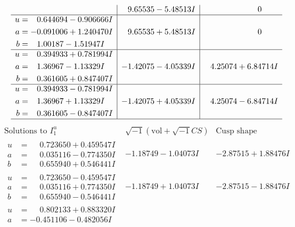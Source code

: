 \documentclass[1p]{elsarticle_modified}
\theoremstyle{definition}
\newcommand{\I}{\sqrt{-1}}
\begin{document}
$$\begin{array}{c|c|c}
 & \phantom{-}9.65535 - 5.48513 I & \phantom{-0.000000 } 0 \\ \hline\begin{aligned}
u &= \phantom{-}0.644694 - 0.906666 I \\
a &= -0.091006 + 1.240470 I \\
b &= \phantom{-}1.00187 - 1.51947 I\end{aligned}
 & \phantom{-}9.65535 + 5.48513 I & \phantom{-0.000000 } 0 \\ \hline\begin{aligned}
u &= \phantom{-}0.394933 + 0.781994 I \\
a &= \phantom{-}1.36967 - 1.13329 I \\
b &= \phantom{-}0.361605 + 0.847407 I\end{aligned}
 & -1.42075 - 4.05339 I & \phantom{-}4.25074 + 6.84714 I \\ \hline\begin{aligned}
u &= \phantom{-}0.394933 - 0.781994 I \\
a &= \phantom{-}1.36967 + 1.13329 I \\
b &= \phantom{-}0.361605 - 0.847407 I\end{aligned}
 & -1.42075 + 4.05339 I & \phantom{-}4.25074 - 6.84714 I\\
 \hline 
 \end{array}$$\newpage$$\begin{array}{c|c|c}  
\text{Solutions to }I^u_{1}& \I (\text{vol} + \sqrt{-1}CS) & \text{Cusp shape}\\
 \hline 
\begin{aligned}
u &= \phantom{-}0.723650 + 0.459547 I \\
a &= \phantom{-}0.035116 - 0.774350 I \\
b &= \phantom{-}0.655940 + 0.546441 I\end{aligned}
 & -1.18749 - 1.04073 I & -2.87515 + 1.88476 I \\ \hline\begin{aligned}
u &= \phantom{-}0.723650 - 0.459547 I \\
a &= \phantom{-}0.035116 + 0.774350 I \\
b &= \phantom{-}0.655940 - 0.546441 I\end{aligned}
 & -1.18749 + 1.04073 I & -2.87515 - 1.88476 I \\ \hline\begin{aligned}
u &= \phantom{-}0.802133 + 0.883320 I \\
a &= -0.451106 - 0.482056 I \\

\end{aligned}
\end{array}$$
\end{document}
